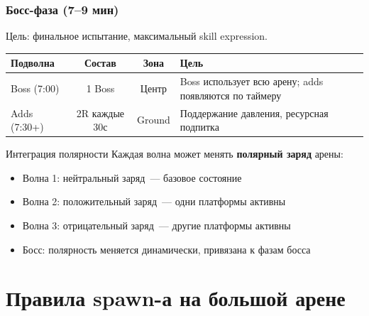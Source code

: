 \documentclass[a4paper,11pt]{report}
\begin{document}
\subsubsection{Босс-фаза (7--9 мин)}

Цель: финальное испытание, максимальный skill expression.

\begin{table}[H]
\centering
\begin{tabularx}{\textwidth}{@{}l c c X@{}}
\toprule
\textbf{Подволна} & \textbf{Состав} & \textbf{Зона} & \textbf{Цель} \\
\midrule
Boss (7:00) & 1 Boss & Центр & Boss использует всю арену; adds появляются по таймеру \\
Adds (7:30+) & 2R каждые 30с & Ground & Поддержание давления, ресурсная подпитка \\
\bottomrule
\end{tabularx}
\end{table}

\begin{polarity}{Интеграция полярности}
Каждая волна может менять \textbf{полярный заряд} арены:
\begin{itemize}
  \item Волна 1: нейтральный заряд~--- базовое состояние
  \item Волна 2: положительный заряд~--- одни платформы активны
  \item Волна 3: отрицательный заряд~--- другие платформы активны
  \item Босс: полярность меняется динамически, привязана к фазам босса
\end{itemize}
\end{polarity}


\section{Правила spawn-а на большой арене}
\end{document}
